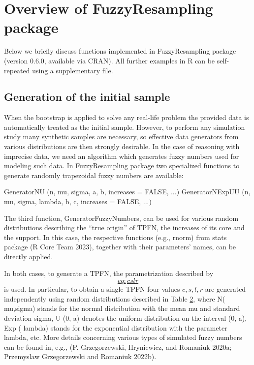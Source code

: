 \hypertarget{over}{%
\section{Overview of FuzzyResampling package}\label{over}}

Below we briefly discuss functions implemented in FuzzyResampling
package (version 0.6.0, available via CRAN). All further examples in R
can be self-repeated using a supplementary file.

\hypertarget{genofinsa}{%
\subsection{Generation of the initial sample}\label{genofinsa}}

When the bootstrap is applied to solve any real-life problem the
provided data is automatically treated as the initial sample. However,
to perform any simulation study many synthetic samples are necessary, so
effective data generators from various distributions are then strongly
desirable. In the case of reasoning with imprecise data, we need an
algorithm which generates fuzzy numbers used for modeling such data. In
FuzzyResampling package two specialized functions to generate randomly
trapezoidal fuzzy numbers are available:

\begin{example}
GeneratorNU (n, mu, sigma, a, b, increases = FALSE, ...)
GeneratorNExpUU (n, mu, sigma, lambda, b, c, increases = FALSE, ...)
\end{example}

The third function, GeneratorFuzzyNumbers, can be used for various
random distributions describing the ``true origin'' of TPFN, the increases
of its core and the support. In this case, the respective functions
(e.g., rnorm) from stats package (R Core Team 2023), together with their
parameters' names, can be directly applied.

In both cases, to generate a TPFN, the parametrization described by
\protect\hyperlink{eq:cslr}{\[eq:cslr\]} is
used. In particular, to obtain a single TPFN four values \(c,s,l,r\) are
generated independently using random distributions described in Table
\protect\hyperlink{tab100}{2}, where N(
mu,sigma) stands for the normal distribution with the mean mu and
standard deviation sigma, U (0, a) denotes the uniform distribution on
the interval (0, a), Exp ( lambda) stands for the exponential
distribution with the parameter lambda, etc. More details concerning
various types of simulated fuzzy numbers can be found in, e.g.,
(P. Grzegorzewski, Hryniewicz, and Romaniuk 2020a; Przemyslaw Grzegorzewski and Romaniuk 2022b).

